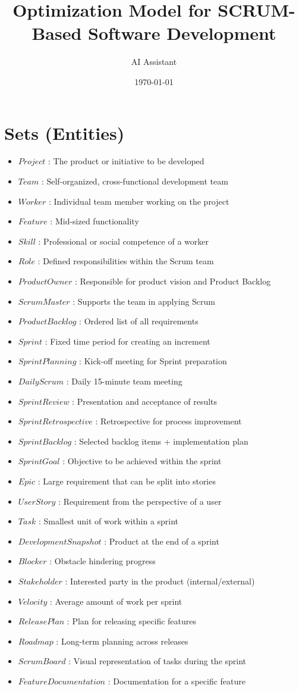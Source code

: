 \documentclass{article}
\title{Optimization Model for SCRUM-Based Software Development}
\author{AI Assistant}
\date{\today}
\begin{document}
\maketitle
\tableofcontents

\section{Sets (Entities)}
\begin{itemize}
    \item $Project$ : The product or initiative to be developed
    \item $Team$ : Self-organized, cross-functional development team
    \item $Worker$ : Individual team member working on the project
    \item $Feature$ : Mid-sized functionality
    \item $Skill$ : Professional or social competence of a worker
    \item $Role$ : Defined responsibilities within the Scrum team
    \item $ProductOwner$ : Responsible for product vision and Product Backlog
    \item $ScrumMaster$ : Supports the team in applying Scrum
    \item $ProductBacklog$ : Ordered list of all requirements
    \item $Sprint$ : Fixed time period for creating an increment
    \item $SprintPlanning$ : Kick-off meeting for Sprint preparation
    \item $DailyScrum$ : Daily 15-minute team meeting
    \item $SprintReview$ : Presentation and acceptance of results
    \item $SprintRetrospective$ : Retrospective for process improvement
    \item $SprintBacklog$ : Selected backlog items + implementation plan
    \item $SprintGoal$ : Objective to be achieved within the sprint
    \item $Epic$ : Large requirement that can be split into stories
    \item $UserStory$ : Requirement from the perspective of a user
    \item $Task$ : Smallest unit of work within a sprint
    \item $DevelopmentSnapshot$ : Product at the end of a sprint
    \item $Blocker$ : Obstacle hindering progress
    \item $Stakeholder$ : Interested party in the product (internal/external)
    \item $Velocity$ : Average amount of work per sprint
    \item $ReleasePlan$ : Plan for releasing specific features
    \item $Roadmap$ : Long-term planning across releases
    \item $ScrumBoard$ : Visual representation of tasks during the sprint
    \item $FeatureDocumentation$ : Documentation for a specific feature
\end{itemize}
\end{document}
